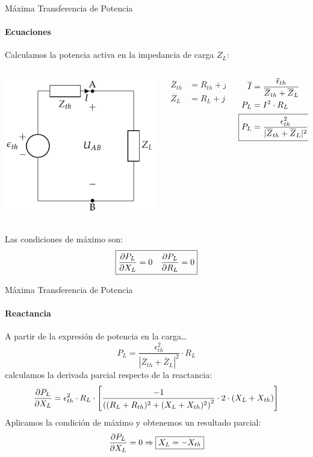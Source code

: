 \documentclass[aspectratio=169, usenames,svgnames,dvipsnames]{beamer}
\begin{document}
\begin{frame}[label={sec:org6e5496b}]{Máxima Transferencia de Potencia}
\framesubtitle{Ecuaciones}
Calculamos la potencia activa en la impedancia de carga \(Z_L\):
\begin{columns}
\begin{column}{0.3\columnwidth}
\begin{center}
\includegraphics[height=0.45\textheight]{../figs/EquivalenteThevenin.pdf}
\end{center}
\end{column}

\begin{column}{0.2\columnwidth}
\begin{align*}
  \overline{Z}_{th} &= R_{th} + jX_{th}\\
  \overline{Z}_L &= R_L + jX_L\\
\end{align*}
\end{column}

\begin{column}{0.4\columnwidth}
\begin{align*}
\overline{I} &= \frac{\overline{\epsilon}_{th}}{\overline{Z}_{th} + \overline{Z}_L}\\
P_L &= I^2 \cdot R_L\\
\Aboxed{P_L &= \frac{\epsilon^2_{th}}{|\overline{Z}_{th} + \overline{Z}_L|^2} \cdot R_L}
\end{align*}
\end{column}
\end{columns}

Las condiciones de máximo son: 
\[
  \boxed{%
    \diffp{P_L}{X_L} = 0 \quad%
    \diffp{P_L}{R_L} = 0%
  }
\]
\end{frame}

\begin{frame}[label={sec:org7647f3e}]{Máxima Transferencia de Potencia}
\framesubtitle{Reactancia}
A partir de la expresión de potencia en la carga\ldots{}
\[
  P_L = \frac{\epsilon^2_{th}}{|\overline{Z}_{th} + \overline{Z}_L|^2} \cdot R_L
\]
calculamos la derivada parcial respecto de la reactancia:
\[
  \diffp{P_L}{X_L} = \epsilon^2_{th} \cdot R_L \cdot \left[\frac{-1}{\left((R_L + R_{th})^2 + (X_L + X_{th})^2\right)^2} \cdot 2 \cdot (X_L + X_{th})\right]
\]
Aplicamos la condición de máximo y obtenemos un resultado parcial:
\[
   \diffp{P_L}{X_L} = 0 \Rightarrow \boxed{X_L = - X_{th}}
\]
\end{frame}
\end{document}
